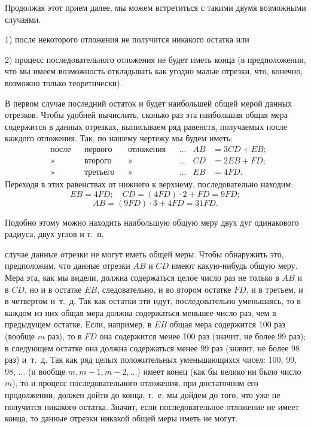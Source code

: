 \documentclass[oneside]{book}
\begin{document}
Продолжая этот прием далее, мы можем встретиться с такими двумя возможными случаями.

1) после некоторого отложения не получится никакого остатка или

2) процесс последовательного отложения не будет иметь конца (в предположении, что мы имеем возможность откладывать как угодно малые отрезки, что, конечно, возможно только теоретически).

В первом случае последний остаток и будет наибольшей общей мерой данных отрезков.
Чтобы удобней вычислить, сколько раз эта наибольшая общая мера содержится в данных отрезках, выписываем ряд равенств, получаемых после каждого отложения.
Так, по нашему чертежу мы будем иметь:
\begin{align*}
&\text{после}
&&\text{первого}
&&\text{отложения}
&&\dots
&AB &= 3CD + EB;
\\
&\text{»}
&&\text{второго}
&&\text{»}
&&\dots
&CD &= 2EB + FD;
\\
&\text{»}
&&\text{третьего}
&&\text{»}
&&\dots
&EB &= 4FD.
\end{align*}
Переходя в этих равенствах от нижнего к верхнему, последовательно находим:
\[
EB=4FD;
\quad
CD=(4FD)\cdot 2+FD=9FD;
\]
\[
AB=(9FD)\cdot 3+4FD=31FD.
\]

Подобно этому можно находить наибольшую общую меру двух дуг одинакового радиуса, двух углов и т.~п.

 случае данные отрезки не могут иметь общей меры.
Чтобы обнаружить это, предположим, что данные отрезки $AB$ и $CD$ имеют какую-нибудь общую меру.
Мера эта, как мы видели, должна содержаться целое число раз не только в $AB$ и в $CD$, но и в остатке $EB$, следовательно, и во втором остатке $FD$, и в третьем, и в четвертом и~т.~д.
Так как остатки эти идут, последовательно уменьшаясь, то в каждом из них общая мера должна содержаться меньшее число раз, чем в предыдущем остатке.
Если, например, в $EB$ общая мера содержится 100 раз (вообще $m$ раз), то в $FD$ она содержится менее 100 раз (значит, не более 99 раз);
в следующем остатке она должна содержаться менее 99 раз (значит, не более 98 раз) и~т.~д.
Так как ряд целых положительных уменьшающихся чисел:
100, 99, 98, ...
(и вообще $m, m-1, m-2,\dots$) имеет конец (как бы велико ни было число $m$), то и процесс последовательного отложения, при достаточном его продолжении, должен дойти до конца, т.~е. мы дойдем до того, что уже не получится никакого остатка.
Значит, если последовательное отложение не имеет конца, то данные отрезки никакой общей меры иметь не могут.
\end{document}
